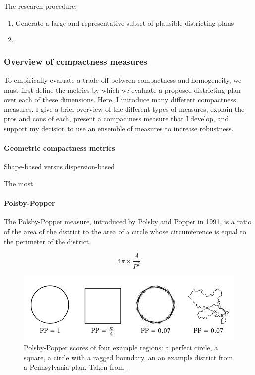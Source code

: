 \documentclass[]{article}
\let\oldparagraph\paragraph
\renewcommand{\paragraph}[1]{\oldparagraph{#1}\mbox{}}
\begin{document}
The research procedure:

\begin{enumerate}
\def\labelenumi{\arabic{enumi}.}
\item
  Generate a large and representative subset of plausible districting
  plans
\item
\end{enumerate}

\hypertarget{overview-of-compactness-measures}{%
\subsubsection{Overview of compactness
measures}\label{overview-of-compactness-measures}}

To empirically evaluate a trade-off between compactness and homogeneity,
we must first define the metrics by which we evaluate a proposed
districting plan over each of these dimensions. Here, I introduce many
different compactness measures. I give a brief overview of the different
types of measures, explain the pros and cons of each, present a
compactness measure that I develop, and support my decision to use an
ensemble of measures to increase robustness.

\hypertarget{geometric-compactness-metrics}{%
\paragraph{Geometric compactness
metrics}\label{geometric-compactness-metrics}}

Shape-based versus dispersion-based

The most

\hypertarget{polsby-popper}{%
\paragraph{Polsby-Popper}\label{polsby-popper}}

The Polsby-Popper measure, introduced by Polsby and Popper in 1991, is a
ratio of the area of the district to the area of a circle whose
circumference is equal to the perimeter of the district.

\[4\pi \times \frac{A}{P^2}\]

\begin{figure}
\centering
\includegraphics{img/pp_example.png}
\caption{Polsby-Popper scores of four example regions: a perfect circle,
a square, a circle with a ragged boundary, an an example district from a
Pennsylvania plan. Taken from \cite{s2020}.}
\end{figure}
\end{document}
